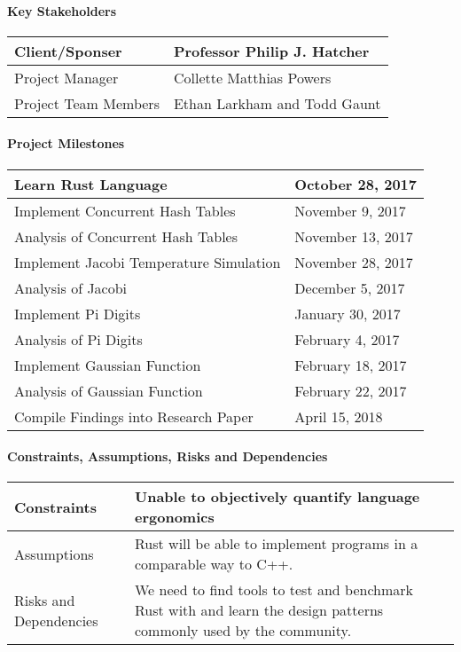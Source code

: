 \documentclass[10pt,a4paper]{report}
\begin{document}
\paragraph{Key Stakeholders}
\begin{flushleft}
	\begin{tabulary}{\textwidth}{ | L | L | }
		\hline
		Client/Sponser & Professor Philip J. Hatcher \\
		\hline
		Project Manager & Collette Matthias Powers \\
		\hline
		Project Team Members & Ethan Larkham and Todd Gaunt \\
		\hline
	\end{tabulary}
\end{flushleft}
\paragraph{Project Milestones}
\begin{flushleft}
	\begin{tabulary}{\textwidth}{ | L | L | }
		\hline
		Learn Rust Language & October 28, 2017 \\
		\hline
		Implement Concurrent Hash Tables & November 9, 2017 \\
		Analysis of Concurrent Hash Tables & November 13, 2017 \\
		\hline
		Implement Jacobi Temperature Simulation & November 28, 2017 \\
		Analysis of Jacobi & December 5, 2017 \\
		\hline
		Implement Pi Digits & January 30, 2017 \\
		Analysis of Pi Digits & February 4, 2017 \\
		\hline
		Implement Gaussian Function & February 18, 2017 \\
		Analysis of Gaussian Function & February 22, 2017 \\
		\hline
		Compile Findings into Research Paper & April 15, 2018 \\
		\hline
	\end{tabulary}
\end{flushleft}
\paragraph{Constraints, Assumptions, Risks and Dependencies}
\begin{flushleft}
	\begin{tabulary}{\textwidth}{ | L | L | }
		\hline
		Constraints & Unable to objectively quantify language
		ergonomics \\
		\hline
		Assumptions & Rust will be able to implement programs in a
		comparable way to C++. \\
		\hline
		Risks and Dependencies & We need to find tools to test and
    benchmark Rust with and learn the design patterns commonly
    used by the community. \\
		\hline
	\end{tabulary}
\end{flushleft}
\end{document}

